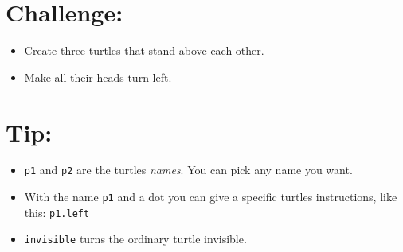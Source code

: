 \section*{\color{BrickRed}Challenge:}


\begin{itemize}

\item {Create three turtles that stand above each other.}
\item {Make all their heads turn left.}

\end{itemize}


\section*{\color{OliveGreen}Tip:}


\begin{itemize}

\item {\lstinline{p1} and \lstinline{p2} are the turtles {\it names}. You can pick any name you want.}
\item {With the name \lstinline{p1} and a dot you can give a specific turtles instructions, like this: \lstinline{p1.left}}
\item {\lstinline{invisible} turns the ordinary turtle invisible.}

\end{itemize}


